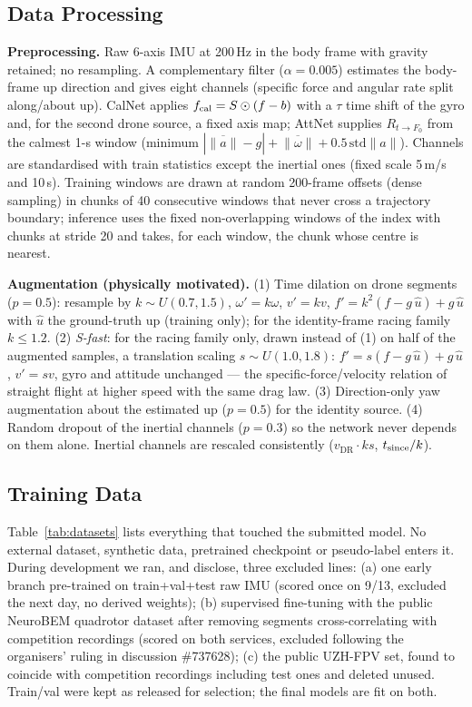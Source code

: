 \documentclass[letterpaper,10pt,conference]{ieeeconf}
\newcommand{\vdr}{v_{\mathrm{DR}}}
\begin{document}
\subsection{Data Processing}
\textbf{Preprocessing.} Raw 6-axis IMU at 200\,Hz in the body frame with gravity retained; no
resampling. A complementary filter ($\alpha=0.005$) estimates the body-frame up direction and gives
eight channels (specific force and angular rate split along/about up). CalNet applies
$f_{\rm cal}=S\odot(f-b)$ with a $\tau$ time shift of the gyro and, for the second drone source, a
fixed axis map; AttNet supplies $R_{t\to F_0}$ from the calmest 1-s window (minimum
$|\overline{\|a\|}-g|+\overline{\|\omega\|}+0.5\,\mathrm{std}\|a\|$). Channels are standardised
with train statistics except the inertial ones (fixed scale 5\,m/s and 10\,s). Training windows are
drawn at random 200-frame offsets (dense sampling) in chunks of 40 consecutive windows that never
cross a trajectory boundary; inference uses the fixed non-overlapping windows of the index with
chunks at stride 20 and takes, for each window, the chunk whose centre is nearest.

\textbf{Augmentation (physically motivated).} (1) Time dilation on drone segments ($p=0.5$):
resample by $k\sim U(0.7,1.5)$, $\omega'=k\omega$, $v'=kv$, $f'=k^2(f-g\,\hat u)+g\,\hat u$ with
$\hat u$ the ground-truth up (training only); for the identity-frame racing family $k\le1.2$.
(2) \emph{S-fast}: for the racing family only, drawn instead of (1) on half of the augmented
samples, a translation scaling $s\sim U(1.0,1.8)$: $f'=s(f-g\,\hat u)+g\,\hat u$, $v'=sv$, gyro and
attitude unchanged --- the specific-force/velocity relation of straight flight at higher speed with
the same drag law. (3) Direction-only yaw augmentation about the estimated up ($p=0.5$) for the
identity source. (4) Random dropout of the inertial channels ($p=0.3$) so the network never depends
on them alone. Inertial channels are rescaled consistently ($\vdr\cdot ks$, $t_{\rm since}/k$).

\subsection{Training Data}
Table~\ref{tab:datasets} lists everything that touched the submitted model. No external dataset,
synthetic data, pretrained checkpoint or pseudo-label enters it. During development we ran, and
disclose, three excluded lines: (a) one early branch pre-trained on train+val+test raw IMU (scored
once on 9/13, excluded the next day, no derived weights); (b) supervised fine-tuning with the public
NeuroBEM quadrotor dataset after removing segments cross-correlating with competition recordings
(scored on both services, excluded following the organisers' ruling in discussion \#737628);
(c) the public UZH-FPV set, found to coincide with competition recordings including test ones and
deleted unused. Train/val were kept as released for selection; the final models are fit on both.
\end{document}
